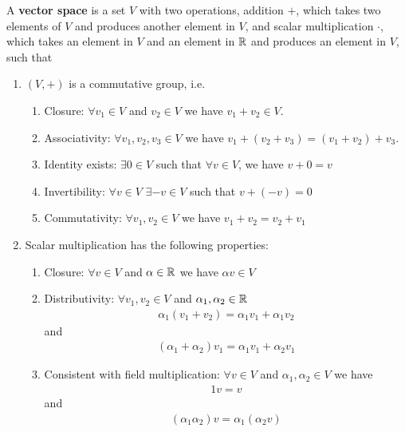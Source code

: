 \begin{definition}
  A \textbf{vector space} is a set $V$  with
  two operations, addition $+$, which takes two elements of $V$ and
  produces another element in $V$, and scalar multiplication $\cdot$,
  which takes an element in $V$ and an element in $\mathbb{R}$ and
  produces an element in $V$, such that
  \begin{enumerate}
  \item $(V, +)$ is a commutative group, i.e.
    \begin{enumerate}
    \item Closure: $\forall v_1 \in V$ and $v_2 \in V$ we have $v_1
      + v_2 \in V$. 
    \item Associativity: $\forall v_1, v_2, v_3 \in V$ we have $v_1
      + (v_2 + v_3 ) = (v_1 + v_2) + v_3 $. 
    \item Identity exists: $\exists 0 \in V$ such that $\forall v \in
      V$, we have $v + 0 = v$
    \item Invertibility: $\forall v \in V$ $\exists -v \in V$ such
      that $v + (-v) = 0$
    \item Commutativity: $\forall v_1, v_2 \in V$ we have $v_1+v_2 =
      v_2 + v_1$
    \end{enumerate}
  \item Scalar multiplication has the following properties:
    \begin{enumerate}
    \item Closure: $\forall v \in V$ and $\alpha \in \mathbb{R}$ we have
      $\alpha v \in V$
    \item Distributivity: $\forall v_1 , v_2 \in V$ and $\alpha_1, \alpha_2 \in
      \mathbb{R}$
      \begin{align*}
        \alpha_1 (v_1 + v_2) = \alpha_1 v_1 + \alpha_1 v_2 
      \end{align*}
      and 
      \begin{align*}
        (\alpha_1 + \alpha_2)v_1 = \alpha_1 v_1 + \alpha_2 v_1
      \end{align*}
    \item Consistent with field multiplication: $\forall v \in V$ and
      $\alpha_1, \alpha_2 \in V$ we have
      \begin{align*}
        1 v = v
      \end{align*}
      and 
      \begin{align*}
        (\alpha_1 \alpha_2) v =\alpha_1 (\alpha_2 v)
      \end{align*}
    \end{enumerate}
  \end{enumerate}
\end{definition}
